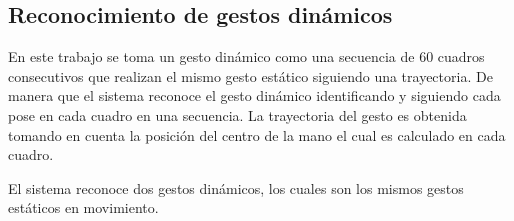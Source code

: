 \subsection{Reconocimiento de gestos dinámicos}\label{RecognitionDynamic}



En este trabajo se toma un gesto dinámico como una secuencia de $60$ cuadros consecutivos que realizan el mismo gesto estático siguiendo una trayectoria. De manera que el sistema reconoce el gesto dinámico identificando y siguiendo cada pose en cada cuadro en una secuencia. La trayectoria del gesto es obtenida tomando en cuenta la posición del centro de la mano el cual es calculado en cada cuadro. 
 
El sistema reconoce dos gestos dinámicos, los cuales son los mismos gestos estáticos en movimiento.
\begin{figure}[h!]
\begin{center}
      \quad
{}

\end{center}
\end{figure}
